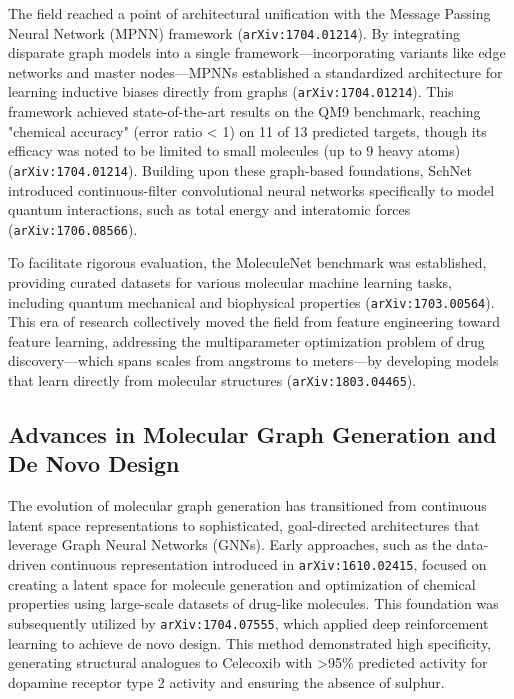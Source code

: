 \documentclass[11pt]{article}
\begin{document}
The field reached a point of architectural unification with the Message Passing Neural Network (MPNN) framework (\texttt{arXiv:1704.01214}). By integrating disparate graph models into a single framework—incorporating variants like edge networks and master nodes—MPNNs established a standardized architecture for learning inductive biases directly from graphs (\texttt{arXiv:1704.01214}). This framework achieved state-of-the-art results on the QM9 benchmark, reaching "chemical accuracy" (error ratio < 1) on 11 of 13 predicted targets, though its efficacy was noted to be limited to small molecules (up to 9 heavy atoms) (\texttt{arXiv:1704.01214}). Building upon these graph-based foundations, SchNet introduced continuous-filter convolutional neural networks specifically to model quantum interactions, such as total energy and interatomic forces (\texttt{arXiv:1706.08566}).

To facilitate rigorous evaluation, the MoleculeNet benchmark was established, providing curated datasets for various molecular machine learning tasks, including quantum mechanical and biophysical properties (\texttt{arXiv:1703.00564}). This era of research collectively moved the field from feature engineering toward feature learning, addressing the multiparameter optimization problem of drug discovery—which spans scales from angstroms to meters—by developing models that learn directly from molecular structures (\texttt{arXiv:1803.04465}).

\subsection{Advances in Molecular Graph Generation and De Novo Design}

The evolution of molecular graph generation has transitioned from continuous latent space representations to sophisticated, goal-directed architectures that leverage Graph Neural Networks (GNNs). Early approaches, such as the data-driven continuous representation introduced in \texttt{arXiv:1610.02415}, focused on creating a latent space for molecule generation and optimization of chemical properties using large-scale datasets of drug-like molecules. This foundation was subsequently utilized by \texttt{arXiv:1704.07555}, which applied deep reinforcement learning to achieve de novo design. This method demonstrated high specificity, generating structural analogues to Celecoxib with >95\% predicted activity for dopamine receptor type 2 activity and ensuring the absence of sulphur.
\end{document}
